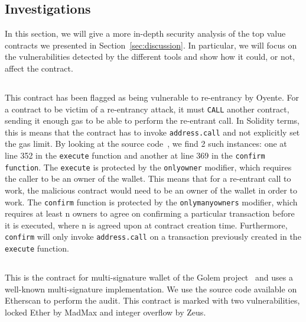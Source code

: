 \subsection{Investigations}
\label{sec:5a:investigations}
In this section, we will give a more in-depth security analysis of the top value contracts we presented in Section~\ref{sec:discussion}. In particular, we will focus on the vulnerabilities detected by the different tools and show how it could, or not, affect the contract.

\subsection*{}
  This contract has been flagged as being vulnerable to re-entrancy by Oyente. For a contract to be victim of a re-entrancy attack, it must \lstinline{CALL} another contract, sending it enough gas to be able to perform the re-entrant call. In Solidity terms, this is means that the contract has to invoke \lstinline{address.call} and not explicitly set the gas limit. By looking at the source code~\cite{ether-foundation-contract-code}, we find 2 such instances: one at line 352 in the \lstinline{execute} function and another at line 369 in the \lstinline{confirm function}. The \lstinline{execute} is protected by the \lstinline{onlyowner} modifier, which requires the caller to be an owner of the wallet. This means that for a re-entrant call to work, the malicious contract would need to be an owner of the wallet in order to work. The \lstinline{confirm} function is protected by the \lstinline{onlymanyowners} modifier, which requires at least n owners to agree on confirming a particular transaction before it is executed, where n is agreed upon at contract creation time. Furthermore, \lstinline{confirm} will only invoke \lstinline{address.call} on a transaction previously created in the \lstinline{execute} function.

\subsection*{}
This is the contract for multi-signature wallet of the Golem project~\cite{golem-project} and uses a well-known multi-signature implementation. We use the source code available on Etherscan to perform the audit.
This contract is marked with two vulnerabilities, locked Ether by MadMax and integer overflow by Zeus.

